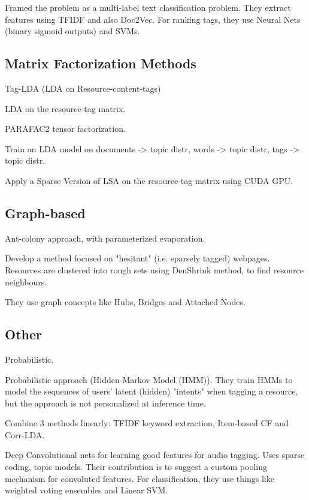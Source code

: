 \cite{tao_yao_2016}

Framed the problem as a multi-label text classification problem. They extract features using TFIDF and also Doc2Vec. For ranking tags, they use Neural Nets (binary sigmoid outputs) and SVMs.


\subsection{Matrix Factorization Methods}

\cite{si_sun_2008} Tag-LDA (LDA on Resource-content-tags)

\cite{bundschus_etal_2009} LDA on the resource-tag matrix.

\cite{panagakis_kotropoulos_2011} PARAFAC2 tensor factorization.

\cite{hu_etal_2012} Train an LDA model on documents -> topic distr, words -> topic distr, tags -> topic distr.

\cite{zhang_etal_2014} Apply a Sparse Version of LSA on the resource-tag matrix using CUDA GPU.


\subsection{Graph-based}

\cite{sharma_bedi_2009} Ant-colony approach, with parameterized evaporation.

\cite{wang_etal_2015} Develop a method focused on "hesitant" (i.e. sparsely tagged) webpages. Resources are clustered into rough sets using DenShrink method, to find resource neighbours.

They use graph concepts like Hubs, Bridges and Attached Nodes.

\subsection{Other}

\cite{si_sun_2010} Probabilistic.

\cite{trabelsi_etal_2012} Probabilistic approach (Hidden-Markov Model (HMM)). They train HMMs to model the sequences of users' latent (hidden) "intents" when tagging a resource, but the approach is not personalized at inference time.

\cite{liu_etal_2013} Combine 3 methods linearly: TFIDF keyword extraction, Item-based CF and Corr-LDA.



\cite{sattigeri_etal_2014}
Deep Convolutional nets for learning good features for audio tagging. Uses sparse coding, topic models.
Their contribution is to suggest a custom pooling mechanism for convoluted features.
For classification, they use things like weighted voting ensembles and Linear SVM.



